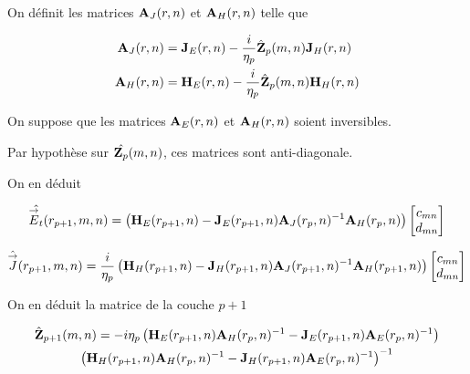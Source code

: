         On définit les matrices \(\mathbf{A}_{J}(r,n)\) et \(\mathbf{A}_{H}(r,n)\) telle que

        \begin{align}
            \mathbf{A}_{J}(r,n) &= \mathbf{J}_{E}(r,n) - \dfrac{i}{\eta_p}\hat{\mathbf{Z}}_p(m,n)\mathbf{J}_{H}(r,n)
            \\
            \mathbf{A}_{H}(r,n) &= \mathbf{H}_{E}(r,n) - \dfrac{i}{\eta_p}\hat{\mathbf{Z}}_p(m,n)\mathbf{H}_{H}(r,n)
        \end{align}

        On suppose que les matrices \(\mathbf{A}_{E}(r,n)\) et \(\mathbf{A}_{H}(r,n)\) soient inversibles.


        Par hypothèse sur \(\hat{\mathbf{Z}_p}(m,n)\), ces matrices sont anti-diagonale.

        On en déduit

        \begin{equation}
            \hat{{\overset{\rightarrow}{E}}_t}(r_{p+1},m,n) =
            \left(
                \mathbf{H}_{E}(r_{p+1},n)
                -
                \mathbf{J}_{E}(r_{p+1},n)
                \mathbf{A}_{J}(r_p,n)^{-1}
                \mathbf{A}_{H}(r_p,n)
            \right)
            \begin{bmatrix}
                c_{mn}
                \\
                d_{mn}
            \end{bmatrix}
        \end{equation}


        \begin{equation}
            \hat{{\overset{\rightarrow}{J}}}(r_{p+1},m,n) = \dfrac{i}{\eta_p}
            \left(
                \mathbf{H}_{H}(r_{p+1},n)
                -
                \mathbf{J}_{H}(r_{p+1},n)
                \mathbf{A}_{J}(r_{p+1},n)^{-1}
                \mathbf{A}_{H}(r_{p+1},n)
            \right)
            \begin{bmatrix}
                c_{mn}
                \\
                d_{mn}
            \end{bmatrix}
        \end{equation}

        On en déduit la matrice de la couche \(p+1\)

        \begin{multline}
            \hat{\mathbf{Z}}_{p+1}(m,n) = -i\eta_p
            \left(
                \mathbf{H}_{E}(r_{p+1},n)
                \mathbf{A}_{H}(r_p,n)^{-1}
                -
                \mathbf{J}_{E}(r_{p+1},n)
                \mathbf{A}_{E}(r_p,n)^{-1}
            \right)
            \\
            \left(
                \mathbf{H}_{H}(r_{p+1},n)
                \mathbf{A}_{H}(r_p,n)^{-1}
                -
                \mathbf{J}_{H}(r_{p+1},n)
                \mathbf{A}_{E}(r_p,n)^{-1}
            \right)^{-1}
        \end{multline}

